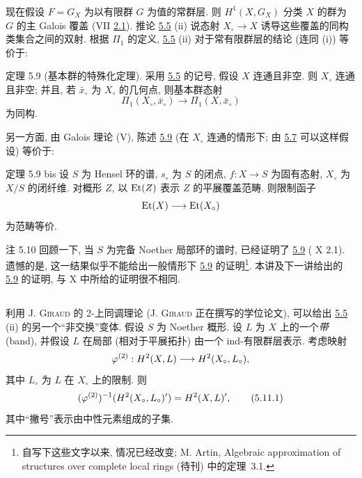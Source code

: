 \setcounter{subsection}{9}
\setcounter{subsubsection}{-1}
\subsubsection{}
现在假设 $F=G_X$ 为以有限群 $G$ 为值的常群层. 则 $H^1(X,G_X)$ 分类 $X$ 的群为 $G$ 的主 Galois 覆盖 (VII \hyperref[VII.rem2.1]{2.1}). 推论 \hyperref[XII.cor5.5]{5.5} (ii) 说态射 $X_{\circ}\longrightarrow X$ 诱导这些覆盖的同构类集合之间的双射. 根据 $\Pi_1$ 的定义, \hyperref[XII.cor5.5]{5.5} (ii) 对于常有限群层的结论 (连同 (i)) 等价于:

\begin{enonce*}{定理 5.9}
(基本群的特殊化定理). 采用 \hyperref[XII.cor5.5]{5.5} 的记号, 假设 $X$ 连通且非空. 则 $X_{\circ}$ 连通且非空; 并且, 若 $\bar x_{\circ}$ 为 $X_{\circ}$ 的几何点, 则基本群态射
$$
\Pi_1(X_{\circ},\bar x_{\circ})\longrightarrow
\Pi_1(X,\bar x_{\circ})
$$
为同构.
\end{enonce*}

另一方面\pageoriginale, 由 Galois 理论 (\SGA V), 陈述 \hyperref[XII.thm5.9]{5.9} (在 $X_{\circ}$ 连通的情形下; 由 \hyperref[XII.cor5.7]{5.7} 可以这样假设) 等价于:

\begin{enonce*}{定理 5.9 bis}
设 $S$ 为 Hensel 环的谱, $s_{\circ}$ 为 $S$ 的闭点, $f:X\longrightarrow S$ 为固有态射, $X_{\circ}$ 为 $X/S$ 的闭纤维. 对概形 $Z$, 以 $\operatorname{Et}(Z)$ 表示 $Z$ 的平展覆盖范畴. 则限制函子
$$
\operatorname{Et}(X)\longrightarrow\operatorname{Et}(X_{\circ})
$$
为范畴等价.
\end{enonce*}

\begin{enonce*}[remark]{注 5.10}
回顾一下, 当 $S$ 为完备 Noether 局部环的谱时, 已经证明了 \hyperref[XII.thm5.9]{5.9} ( X 2.1). 遗憾的是, 这一结果似乎不能给出一般情形下 \hyperref[XII.thm5.9]{5.9} 的证明\footnote[1]{自写下这些文字以来, 情况已经改变; \cf M. Artin, Algebraic approximation of structures over complete local rings (待刊) 中的定理~3.1.}. 本讲及下一讲给出的 \hyperref[XII.thm5.9]{5.9} 的证明, 与  X 中所给的证明很不相同.
\end{enonce*}

\setcounter{subsection}{10}
\subsection{}
利用 J. \textsc{Giraud} 的 2-上同调理论 (\cf J. \textsc{Giraud} 正在撰写的学位论文), 可以给出 \hyperref[XII.cor5.5]{5.5} (ii) 的另一个“非交换”变体. 假设 $S$ 为 Noether 概形. 设 $L$ 为 $X$ 上的一个\emph{带}(band), 并假设 $L$ 在局部 (相对于平展拓扑) 由一个 ind-有限群层表示. 考虑映射
$$
\varphi^{(2)}:H^2(X,L)\longrightarrow H^2(X_{\circ},L_{\circ}){},
$$
其中 $L_{\circ}$ 为 $L$ 在 $X_{\circ}$ 上的限制. 则
\begin{equation*}
(\varphi^{(2)})^{-1}(H^2(X_{\circ},L_{\circ})')
=H^2(X,L)'{},\tag{5.11.1}
\end{equation*}
其中\pageoriginale “撇号”表示由中性元素组成的子集.

